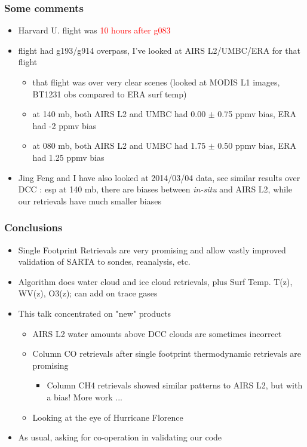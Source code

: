 \documentclass[10pt,t]{beamer}
\begin{document}
\begin{frame}
\frametitle{Some comments}
\begin{itemize}
  \item Harvard U. flight was \textcolor{red}{10 hours after g083}
  \item flight had g193/g914 overpass, I've looked at AIRS L2/UMBC/ERA for that flight
    \begin{itemize}
      \item that flight was over very clear scenes (looked at MODIS L1 images, BT1231 obs compared to ERA surf temp)
      \item at 140 mb, both AIRS L2 and UMBC had 0.00 $\pm$ 0.75 ppmv bias, ERA had -2 ppmv bias
      \item at 080 mb, both AIRS L2 and UMBC had 1.75 $\pm$ 0.50 ppmv bias, ERA had 1.25 ppmv bias      
    \end{itemize}
  \item Jing Feng and I have also looked at 2014/03/04 data, see similar results over DCC : esp at 140 mb, there
        are biases between \emph{in-situ} and AIRS L2, while our retrievals have much smaller biases
\end{itemize}
\end{frame}

\begin{frame}
  \frametitle{Conclusions}
  \begin{itemize}
  \item Single Footprint Retrievals are very promising and allow vastly improved validation of SARTA to sondes, reanalysis, etc.
  \item Algorithm does water cloud and ice cloud retrievals, plus Surf Temp. T(z), WV(z), O3(z); can add on trace gases
  \item This talk concentrated on "new" products
    \begin{itemize}
    \item AIRS L2 water amounts above DCC clouds are sometimes incorrect
    \item Column CO retrievals after single footprint thermodynamic retrievals are promising
    \begin{itemize}
      \item Column CH4 retrievals showed similar patterns to AIRS L2, but with a bias! More work ...
    \end{itemize}
    \item Looking at the eye of Hurricane Florence
    \end{itemize}
  \item As usual, asking for co-operation in validating our code
  \end{itemize}
\end{frame}
\end{document}
